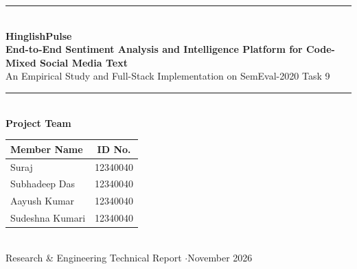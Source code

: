 \documentclass[11pt,a4paper]{article}
\newcommand{\memberid}{12340040}
\begin{document}
\begin{center}
    {\color{navy}\rule{\textwidth}{1.2pt}}\\[1.2em]
    {\Huge\bfseries\color{navy} HinglishPulse}\\[0.5em]
    {\LARGE\bfseries End-to-End Sentiment Analysis and Intelligence Platform for Code-Mixed Social Media Text}\\[0.8em]
    {\large An Empirical Study and Full-Stack Implementation on SemEval-2020 Task 9}\\[1.2em]
    {\color{navy}\rule{\textwidth}{0.5pt}}\\[1.4em]

    {\large\bfseries Project Team}\\[0.6em]
    \begin{tabular}{@{}lc@{}}
        \toprule
        \textbf{Member Name} & \textbf{ID No.} \\
        \midrule
        Suraj           & \memberid \\
        Subhadeep Das   & \memberid \\
        Aayush Kumar    & \memberid \\
        Sudeshna Kumari & \memberid \\
        \bottomrule
    \end{tabular}\\[1.4em]
    {\normalsize Research \& Engineering Technical Report \quad$\cdot$\quad November 2026}
\end{center}

\vspace{0.8em}

\begin{abstract}
\noindent
\textit{Hinglish} --- Hindi and English mixed together and typed in the Latin alphabet --- is the everyday language of millions of social media users, yet it is hard for machines to read: spellings are not standardised, grammar switches mid-sentence, and many words in new text have never been seen before. In this project we build \textbf{HinglishPulse}, a complete and reproducible system that classifies the sentiment (negative, neutral, positive) of Hinglish tweets using the official SemEval-2020 Task 9 (SentiMix) dataset of 20,594 tweets.

We (i) design a text-cleaning and spelling-normalisation pipeline for Romanised Hindi, (ii) build subword features with FastText, and (iii) compare a classical TF-IDF + Logistic Regression baseline against four neural networks: LSTM, BiLSTM, 1D CNN, and a hybrid BiLSTM+Conv1D. The hybrid model performs best, reaching a validation accuracy of \textbf{91.57\%} and a Macro F1-score of \textbf{91.64\%}, compared with 87.10\% and 87.12\% for the baseline. Finally, we deploy the model behind a \textbf{FastAPI} inference service and a dark-themed \textbf{React + TypeScript} dashboard, with hash-verified data hand-offs so that every result can be reproduced.
\end{abstract}
\end{document}
